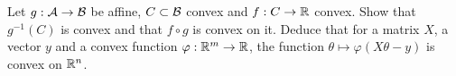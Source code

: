 \begin{notechapter}
\begin{exercise}\label{affine-spaces:exr:9}
Let $g:\mathcal{A}\to\mathcal{B}$ be affine, $C\subset\mathcal{B}$ convex and $f:C\to\mathbb{R}$ convex.
Show that $g^{-1}(C)$ is convex and that $f\circ g$ is convex on it. Deduce
that for a matrix $X$, a vector $y$ and a convex function
$\varphi:\mathbb{R}^m\to\mathbb{R}$, the function $\theta\mapsto\varphi(X\theta - y)$ is
convex on $\mathbb{R}^n$.
\end{exercise}
\end{notechapter}

